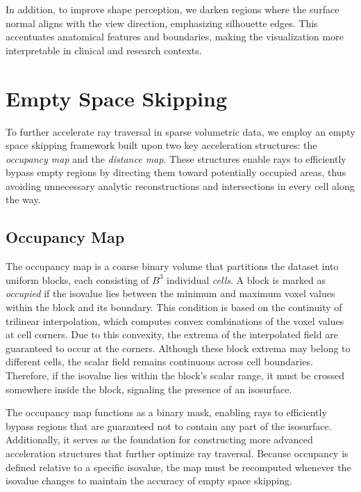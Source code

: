 \documentclass[conference]{IEEEtran}
\begin{document}
In addition, to improve shape perception, we darken regions where the surface normal aligns with the view direction, emphasizing silhouette edges. This accentuates anatomical features and boundaries, making the visualization more interpretable in clinical and research contexts.


\section{Empty Space Skipping}

To further accelerate ray traversal in sparse volumetric data, we employ an empty space skipping framework built upon two key acceleration structures: the \textit{occupancy map} and the \textit{distance map}. These structures enable rays to efficiently bypass empty regions by directing them toward potentially occupied areas, thus avoiding unnecessary analytic reconstructions and intersections in every cell along the way.

\subsection{Occupancy Map}

The occupancy map is a coarse binary volume that partitions the dataset into uniform blocks, each consisting of $B^3$ individual \textit{cells}. A block is marked as \textit{occupied} if the isovalue lies between the minimum and maximum voxel values within the block and its boundary. This condition is based on the continuity of trilinear interpolation, which computes convex combinations of the voxel values at cell corners. Due to this convexity, the extrema of the interpolated field are guaranteed to occur at the corners. Although these block extrema may belong to different cells, the scalar field remains continuous across cell boundaries. Therefore, if the isovalue lies within the block’s scalar range, it must be crossed somewhere inside the block, signaling the presence of an isosurface.

The occupancy map functions as a binary mask, enabling rays to efficiently bypass regions that are guaranteed not to contain any part of the isosurface. Additionally, it serves as the foundation for constructing more advanced acceleration structures that further optimize ray traversal. Because occupancy is defined relative to a specific isovalue, the map must be recomputed whenever the isovalue changes to maintain the accuracy of empty space skipping.

\end{document}
